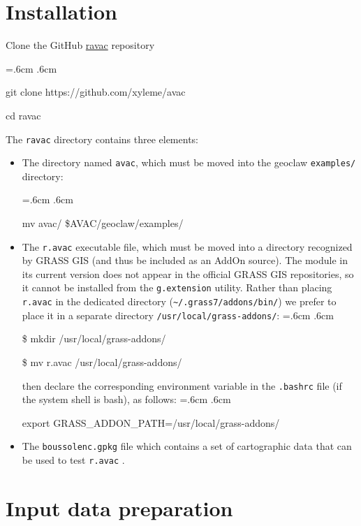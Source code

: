 \documentclass[12pt,oneside]{paper}
\newenvironment{code}{%
\vspace{2mm}%
\hangindent=.6cm%
\parindent.6cm%
\ttfamily%
\color{gris.3}%
}{
\vspace{2mm}%
}
\begin{document}
 

\section{Installation}
Clone the GitHub \href{https://github.com/xyleme/ravac}{ravac} repository

\begin{code}
git clone https://github.com/xyleme/avac

cd ravac
\end{code}

The \texttt{ravac} directory contains three elements:
\begin{itemize}
\item The directory named \texttt{avac}, which must be moved into the geoclaw \texttt{examples/} directory:

\begin{code}
mv avac/ \$AVAC/geoclaw/examples/
\end{code}

\item The \texttt{r.avac} executable file, which must be moved into a directory recognized by GRASS GIS (and thus be included as an AddOn source). The module in its current version does not appear in the official GRASS GIS repositories, so it cannot be installed from the \texttt{g.extension} utility.
Rather than placing \texttt{r.avac} in the dedicated directory (\texttt{\textasciitilde/.grass7/addons/bin/}) we prefer to place it in a separate directory \texttt{/usr/local/grass-addons/}:
\begin{code}
\$ mkdir /usr/local/grass-addons/

\$ mv r.avac /usr/local/grass-addons/
\end{code}
then declare the corresponding environment variable in the \texttt{.bashrc} file  (if the system shell is bash), as follows:
\begin{code}
export GRASS\_ADDON\_PATH=/usr/local/grass-addons/
\end{code}

\item The \texttt{boussolenc.gpkg} file which contains a set of cartographic data that can be used to test \verb+r.avac+ .
\end{itemize}

 

\section{Input data preparation}
\end{document}

